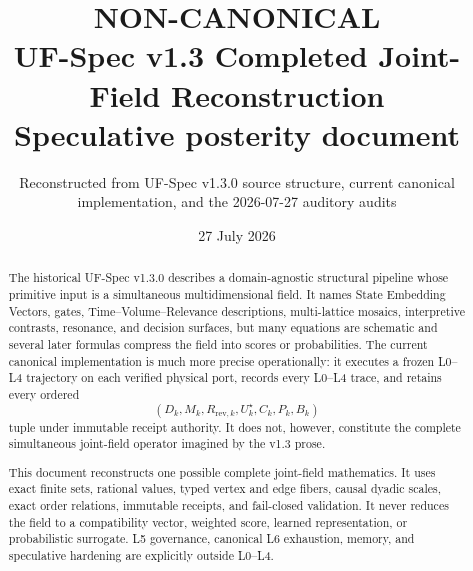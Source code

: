 \documentclass[11pt,oneside]{article}
\title{\textcolor{warningred}{\Huge\bfseries NON-CANONICAL}\\[0.7em]
UF-Spec v1.3 Completed Joint-Field Reconstruction\\[0.5em]
\Large Speculative posterity document}
\author{Reconstructed from UF-Spec v1.3.0 source structure, current canonical
implementation, and the 2026-07-27 auditory audits}
\date{27 July 2026}
\begin{document}
\maketitle

\begin{center}
\end{center}

\vspace{1em}

\begin{abstract}
The historical UF-Spec v1.3.0 describes a domain-agnostic structural pipeline
whose primitive input is a simultaneous multidimensional field. It names
State Embedding Vectors, gates, Time--Volume--Relevance descriptions,
multi-lattice mosaics, interpretive contrasts, resonance, and decision
surfaces, but many equations are schematic and several later formulas compress
the field into scores or probabilities. The current canonical implementation
is much more precise operationally: it executes a frozen L0--L4 trajectory on
each verified physical port, records every L0--L4 trace, and retains every
ordered
\[
  (D_k,M_k,R_{\mathrm{rev},k},U_k^\star,C_k,P_k,B_k)
\]
tuple under immutable receipt authority. It does not, however, constitute the
complete simultaneous joint-field operator imagined by the v1.3 prose.

This document reconstructs one possible complete joint-field mathematics. It
uses exact finite sets, rational values, typed vertex and edge fibers, causal
dyadic scales, exact order relations, immutable receipts, and fail-closed
validation. It never reduces the field to a compatibility vector, weighted
score, learned representation, or probabilistic surrogate. L5 governance,
canonical L6 exhaustion, memory, and speculative hardening are explicitly
outside L0--L4.
\end{abstract}

\tableofcontents
\newpage
\end{document}
